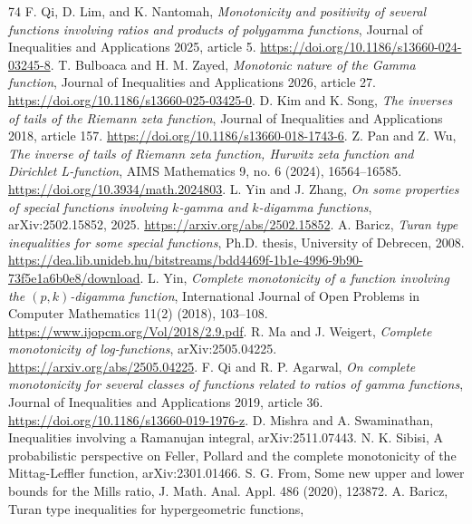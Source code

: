 \begin{thebibliography}{74}
F. Qi, D. Lim, and K. Nantomah,
\emph{Monotonicity and positivity of several functions involving ratios and products of polygamma functions},
Journal of Inequalities and Applications 2025, article 5.
\url{https://doi.org/10.1186/s13660-024-03245-8}.
T. Bulboaca and H. M. Zayed,
\emph{Monotonic nature of the Gamma function},
Journal of Inequalities and Applications 2026, article 27.
\url{https://doi.org/10.1186/s13660-025-03425-0}.
D. Kim and K. Song,
\emph{The inverses of tails of the Riemann zeta function},
Journal of Inequalities and Applications 2018, article 157.
\url{https://doi.org/10.1186/s13660-018-1743-6}.
Z. Pan and Z. Wu,
\emph{The inverse of tails of Riemann zeta function, Hurwitz zeta function and Dirichlet L-function},
AIMS Mathematics 9, no. 6 (2024), 16564--16585.
\url{https://doi.org/10.3934/math.2024803}.
L. Yin and J. Zhang,
\emph{On some properties of special functions involving \(k\)-gamma and \(k\)-digamma functions},
arXiv:2502.15852, 2025.
\url{https://arxiv.org/abs/2502.15852}.
A. Baricz,
\emph{Turan type inequalities for some special functions},
Ph.D. thesis, University of Debrecen, 2008.
\url{https://dea.lib.unideb.hu/bitstreams/bdd4469f-1b1e-4996-9b90-73f5e1a6b0e8/download}.
L. Yin,
\emph{Complete monotonicity of a function involving the \((p,k)\)-digamma function},
International Journal of Open Problems in Computer Mathematics 11(2) (2018), 103--108.
\url{https://www.ijopcm.org/Vol/2018/2.9.pdf}.
R. Ma and J. Weigert,
\emph{Complete monotonicity of log-functions},
arXiv:2505.04225.
\url{https://arxiv.org/abs/2505.04225}.
F. Qi and R. P. Agarwal,
\emph{On complete monotonicity for several classes of functions related to
ratios of gamma functions},
Journal of Inequalities and Applications 2019, article 36.
\url{https://doi.org/10.1186/s13660-019-1976-z}.
D. Mishra and A. Swaminathan,
\newblock Inequalities involving a Ramanujan integral,
\newblock arXiv:2511.07443.
N. K. Sibisi,
\newblock A probabilistic perspective on Feller, Pollard and the complete
  monotonicity of the Mittag-Leffler function,
\newblock arXiv:2301.01466.
S. G. From,
\newblock Some new upper and lower bounds for the Mills ratio,
\newblock J. Math. Anal. Appl. 486 (2020), 123872.
A. Baricz,
\newblock Turan type inequalities for hypergeometric functions,

\end{thebibliography}
